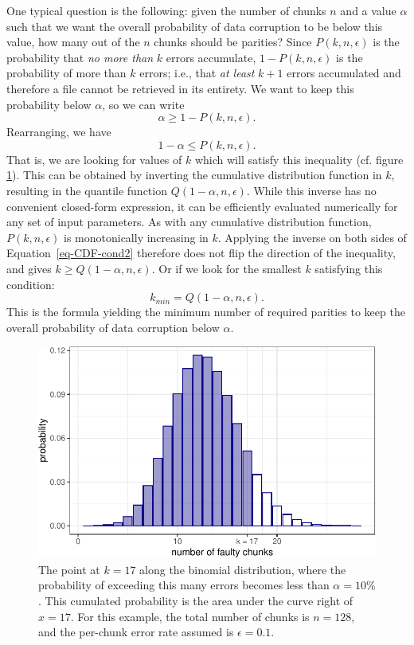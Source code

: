 \documentclass[manuscript,screen,review]{acmart}
\begin{document}
One typical question is the following: given the number of chunks $n$ and a value $\alpha$ such that we want the overall probability of data corruption to be below this value, how many out of the $n$ chunks should be parities? Since $P(k, n, \epsilon)$ is the probability that \emph{no more than} $k$ errors accumulate, $1 - P(k, n, \epsilon)$ is the probability of more than $k$ errors; i.e., that \emph{at least} $k + 1$ errors accumulated and therefore a file cannot be retrieved in its entirety. We want to keep this probability below $\alpha$, so we can write
\begin{equation}
  \alpha \ge 1 - P(k, n, \epsilon) .
  \label{eq-CDF-cond}
\end{equation}
Rearranging, we have
\begin{equation}
  1 - \alpha \le P(k, n, \epsilon) .
  \label{eq-CDF-cond2}
\end{equation}
That is, we are looking for values of $k$ which will satisfy this inequality (cf. figure \ref{fig:alpha}). This can be obtained by inverting the cumulative distribution function in $k$, resulting in the quantile function $Q(1 - \alpha, n, \epsilon)$. While this inverse has no convenient closed-form expression, it can be efficiently evaluated numerically for any set of input parameters. As with any cumulative distribution function, $P(k, n, \epsilon)$ is monotonically increasing in $k$. Applying the inverse on both sides of Equation~\ref{eq-CDF-cond2} therefore does not flip the direction of the inequality, and gives $k \ge Q(1 - \alpha, n, \epsilon)$. Or if we look for the smallest $k$ satisfying this condition:
\begin{equation}
  k_{min} = Q(1 - \alpha, n, \epsilon) .
  \label{eq-quantile-sol-n}
\end{equation}
This is the formula yielding the minimum number of required parities to keep the overall probability of data corruption below $\alpha$.

\begin{figure}[!ht]
  \centering
  \includegraphics[width=.7\textwidth]{fig-alpha-1.pdf}
  \caption{The point at $k=17$ along the binomial distribution, where the probability of exceeding this many errors becomes less than $\alpha = 10\%$. This cumulated probability is the area under the curve right of $x=17$. For this example, the total number of chunks is $n = 128$, and the per-chunk error rate assumed is $\epsilon = 0.1$.}
  \label{fig:alpha}
\end{figure}
\end{document}
